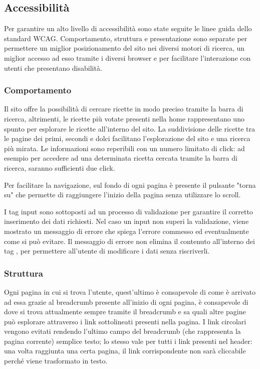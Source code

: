 \subsection{Accessibilità}
\label{sub:accessibilità}
Per garantire un alto livello di accessibilità sono state seguite le linee guida dello standard WCAG. Comportamento, struttura e presentazione sono separate per permettere un miglior posizionamento del sito nei diversi motori di ricerca, un miglior accesso ad esso tramite i diversi browser e per facilitare l'interazione con utenti che presentano disabilità.

\subsubsection{Comportamento}
Il sito offre la possibilità di cercare ricette in modo preciso tramite la barra di ricerca, altrimenti, le ricette più votate presenti nella home rappresentano uno spunto per esplorare le ricette all'interno del sito. La suddivisione delle ricette tra le pagine dei primi, secondi e dolci facilitano l'esplorazione del sito e una ricerca più mirata. Le informazioni sono reperibili con un numero limitato di click: ad esempio per accedere ad una determinata ricetta cercata tramite la barra di ricerca, saranno sufficienti due click.

Per facilitare la navigazione, sul fondo di ogni pagina è presente il pulsante "torna su" che permette di raggiungere l'inizio della pagina senza utilizzare lo scroll.

I tag input sono sottoposti ad un processo di validazione per garantire il corretto inserimento dei dati richiesti. Nel caso un input non superi la validazione, viene mostrato un messaggio di errore che spiega l'errore commesso ed eventualmente come si può evitare. Il messaggio di errore non elimina il contenuto all'interno dei tag , per permettere all'utente di modificare i dati senza riscriverli.

\subsubsection{Struttura}
Ogni pagina in cui si trova l'utente, quest'ultimo è consapevole di come è arrivato ad essa grazie al breadcrumb presente all'inizio di ogni pagina, è consapevole di dove si trova attualmente sempre tramite il breadcrumb e sa quali altre pagine può esplorare attraverso i link sottolineati presenti nella pagina. I link circolari vengono evitati rendendo l'ultimo campo del breadcrumb (che rappresenta la pagina corrente) semplice testo; lo stesso vale per tutti i link presenti nel header: una volta raggiunta una certa pagina, il link corrispondente non sarà cliccabile perché viene trasformato in testo.

